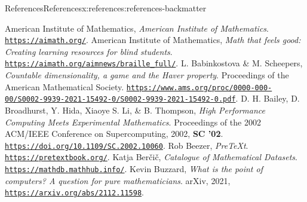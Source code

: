 \documentclass[oneside,10pt,]{article}
\begin{document}
%
%
%
\typeout{************************************************}
\typeout{************************************************}
%
\begin{references-section-numberless}{References}{}{References}{}{}{x:references:references-backmatter}
\begin{referencelist}
\hypertarget{x:biblio:biblio-aim}{}American Institute of Mathematics, \textit{American Institute of Mathematics}. \href{https://aimath.org/}{\nolinkurl{https://aimath.org/}}.
\hypertarget{x:biblio:biblio-braille}{}American Institute of Mathematics, \textit{Math that feels good: Creating learning resources for blind students}. \href{https://aimath.org/aimnews/braille_full/}{\nolinkurl{https://aimath.org/aimnews/braille_full/}}.
\hypertarget{x:biblio:biblio-scheepers}{}L. Babinkostova \& M. Scheepers, \textit{Countable dimensionality, a game and the Haver property}. Proceedings of the American Mathematical Society. \href{https://www.ams.org/proc/0000-000-00/S0002-9939-2021-15492-0/S0002-9939-2021-15492-0.pdf}{\nolinkurl{https://www.ams.org/proc/0000-000-00/S0002-9939-2021-15492-0/S0002-9939-2021-15492-0.pdf}}.
\hypertarget{x:biblio:biblio-high-compute}{}D. H. Bailey, D. Broadhurst, Y. Hida, Xiaoye S. Li, \& B. Thompson, \textit{High Performance Computing Meets Experimental Mathematics}. Proceedings of the 2002 ACM\slash{}IEEE Conference on Supercomputing, 2002, \textbf{SC '02}. \href{https://doi.org/10.1109/SC.2002.10060}{\nolinkurl{https://doi.org/10.1109/SC.2002.10060}}.
\hypertarget{x:biblio:biblio-pretext}{}Rob Beezer, \textit{PreTeXt}. \href{https://pretextbook.org/}{\nolinkurl{https://pretextbook.org/}}.
\hypertarget{x:biblio:biblio-mathdb}{}Katja Berčič, \textit{Catalogue of Mathematical Datasets}. \href{https://mathdb.mathhub.info/}{\nolinkurl{https://mathdb.mathhub.info/}}.
\hypertarget{x:biblio:biblio-buzzard}{}Kevin Buzzard, \textit{What is the point of computers? A question for pure mathematicians}. arXiv, 2021, \href{https://arxiv.org/abs/2112.11598}{\nolinkurl{https://arxiv.org/abs/2112.11598}}.

\end{referencelist}
\end{references-section-numberless}
\end{document}
